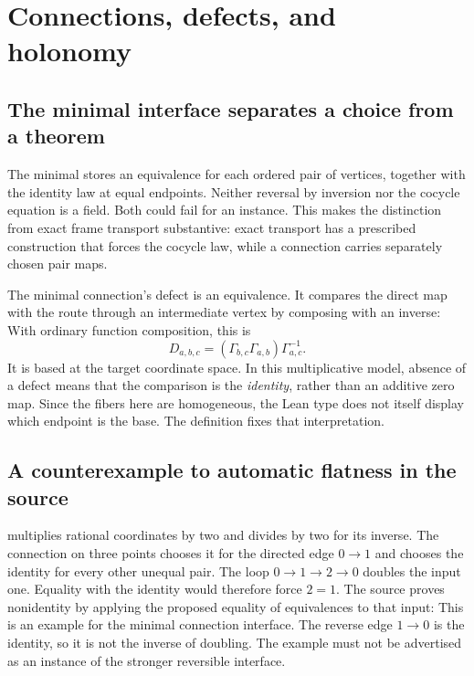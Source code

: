 \clearpage
\section{Connections, defects, and holonomy}
\subsection{The minimal interface separates a choice from a theorem}
The minimal  stores an equivalence for each ordered pair of vertices, together with the identity law at equal endpoints.
Neither reversal by inversion nor the cocycle equation is a field. Both could fail for an instance. This makes the distinction from exact frame transport substantive: exact transport has a prescribed construction that forces the cocycle law, while a connection carries separately chosen pair maps.

The minimal connection's defect is an equivalence. It compares the direct map with the route through an intermediate vertex by composing with an inverse:
With ordinary function composition, this is
\[
 D_{a,b,c}=(\Gamma_{b,c}\Gamma_{a,b})\Gamma_{a,c}^{-1}.
\]
It is based at the target coordinate space. In this multiplicative model, absence of a defect means that the comparison is the \emph{identity}, rather than an additive zero map. Since the fibers here are homogeneous, the Lean type does not itself display which endpoint is the base. The definition fixes that interpretation.

\subsection{A counterexample to automatic flatness in the source}
 multiplies rational coordinates by two and divides by two for its inverse. The connection on three points chooses it for the directed edge $0\to1$ and chooses the identity for every other unequal pair.
The loop $0\to1\to2\to0$ doubles the input one. Equality with the identity would therefore force $2=1$. The source proves nonidentity by applying the proposed equality of equivalences to that input:
This is an example for the minimal connection interface. The reverse edge $1\to0$ is the identity, so it is not the inverse of doubling. The example must not be advertised as an instance of the stronger reversible interface.

